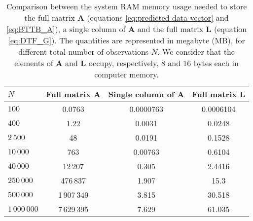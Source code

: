 \begin{table}[h]
	\label{tab:RAM-usage}
	\begin{center}
		\begin{tabular}{|l|c|c|c|}
			\hline
			\textbf{$N$} & \textbf{Full matrix $\mathbf{A}$} & \textbf{Single column of $\mathbf{A}$} 
			& \textbf{Full matrix $\mathbf{L}$}\\
			\hline 
			$100$ & 0.0763 & 0.0000763 & 0.0006104\\
			\hline
			$400$ & 1.22 & 0.0031 & 0.0248\\
			\hline
			$2\,500$ & 48 & 0.0191 & 0.1528\\
			\hline
			$10\,000$ & 763 & 0.00763 & 0.6104\\
			\hline
			$40\,000$ & 12\,207 & 0.305 & 2.4416 \\
			\hline
			$250\,000$ & 476\,837 & 1.907 & 15.3 \\
			\hline
			$500\,000$ & 1\,907\,349 & 3.815 & 30.518 \\
			\hline
			$1\,000\,000$ & 7\,629\,395 & 7.629 & 61.035 \\
			\hline
		\end{tabular}
		\caption{Comparison between the system RAM memory usage needed to store the full matrix $\mathbf{A}$ 
		(equations \ref{eq:predicted-data-vector} and \ref{eq:BTTB_A}), a single column of $\mathbf{A}$ and the 
		full matrix $\mathbf{L}$ (equation \ref{eq:DTF_G}). The quantities are represented in megabyte (MB), for 
		different total number of observations $N$. We consider that the elements of $\mathbf{A}$ and $\mathbf{L}$ 
		occupy, respectively, 8 and 16 bytes each in computer memory.}
	\end{center}
\end{table} 
